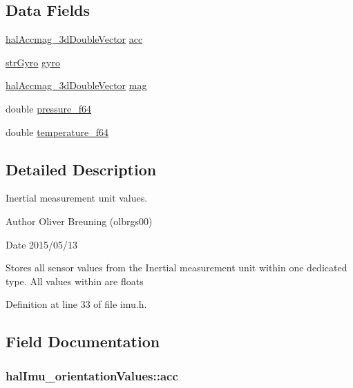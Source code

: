 \subsection*{Data Fields}
\begin{DoxyCompactItemize}
\item 
\hyperlink{structhalAccmag__3dDoubleVector}{hal\+Accmag\+\_\+3d\+Double\+Vector} \hyperlink{structhalImu__orientationValues_a8080616bd2a3d4f01f5334d4bf05427e_a8080616bd2a3d4f01f5334d4bf05427e}{acc}
\item 
\hyperlink{structstrGyro}{str\+Gyro} \hyperlink{structhalImu__orientationValues_a386a3509066dbfd830da6b7a993b31da_a386a3509066dbfd830da6b7a993b31da}{gyro}
\item 
\hyperlink{structhalAccmag__3dDoubleVector}{hal\+Accmag\+\_\+3d\+Double\+Vector} \hyperlink{structhalImu__orientationValues_ac0763bc025ee3aa20f167e74ecccfc3c_ac0763bc025ee3aa20f167e74ecccfc3c}{mag}
\item 
double \hyperlink{structhalImu__orientationValues_a512925b63aa63c02874ce4dbb920c7f0_a512925b63aa63c02874ce4dbb920c7f0}{pressure\+\_\+f64}
\item 
double \hyperlink{structhalImu__orientationValues_aeda72e72e4979977023cba31ee89cffa_aeda72e72e4979977023cba31ee89cffa}{temperature\+\_\+f64}
\end{DoxyCompactItemize}


\subsection{Detailed Description}
Inertial measurement unit values. 



 \begin{DoxyAuthor}{Author}
Oliver Breuning (olbrgs00) 
\end{DoxyAuthor}
\begin{DoxyDate}{Date}
2015/05/13
\end{DoxyDate}
Stores all sensor values from the Inertial measurement unit within one dedicated type. All values within are floats

Definition at line 33 of file imu.\+h.



\subsection{Field Documentation}
\hypertarget{structhalImu__orientationValues_a8080616bd2a3d4f01f5334d4bf05427e_a8080616bd2a3d4f01f5334d4bf05427e}{
\subsubsection[{acc}]{ hal\+Imu\+\_\+orientation\+Values\+::acc}}\label{structhalImu__orientationValues_a8080616bd2a3d4f01f5334d4bf05427e_a8080616bd2a3d4f01f5334d4bf05427e}


